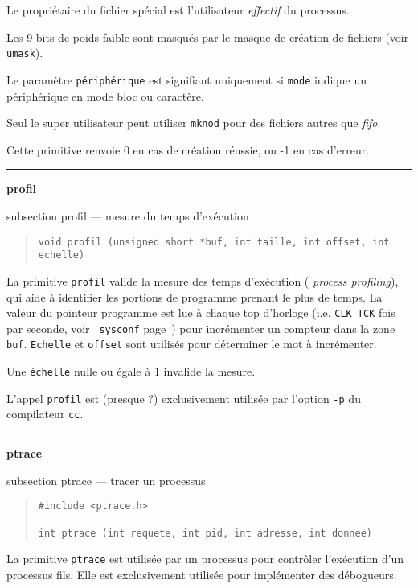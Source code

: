 \documentclass [twoside] {report}
\newcommand {\primitive} [1]
    {
	{\large \bf #1}
	\addcontentsline {toc} {subsection} {#1}
    }
\newcommand {\separation}
    {
	\vspace {7mm}
	\nopagebreak
	\hrule
    }
\begin{document}
Le propriétaire du fichier spécial est
l'utilisateur {\it effectif} du processus.

Les 9 bits de poids faible sont masqués par le
masque de création de fichiers (voir {\tt umask}).

Le paramètre {\tt périphérique} est signifiant
uniquement si {\tt mode} indique un périphérique en
mode bloc ou caractère.

Seul le super utilisateur peut utiliser {\tt mknod}
pour des fichiers autres que {\it fifo}.

Cette primitive renvoie 0 en cas de création
réussie, ou -1 en cas d'erreur.




\separation
\primitive {profil} --- mesure du temps d'exécution

\begin {quote}
\begin {verbatim}
void profil (unsigned short *buf, int taille, int offset, int echelle)
\end{verbatim}
\end {quote}

La primitive {\tt profil} valide la mesure des temps d'exécution ({\it
process profiling}), qui aide à identifier les portions de programme
prenant le plus de temps. La valeur du pointeur programme est lue à
chaque top d'horloge (i.e. {\tt CLK\_TCK} fois par seconde, voir {\tt
sysconf} page~\pageref {sysconf}) pour incrémenter un compteur dans
la zone {\tt buf}. {\tt Echelle} et {\tt offset} sont utilisés pour
déterminer le mot à incrémenter.

Une {\tt échelle} nulle ou égale à 1 invalide la
mesure.

L'appel {\tt profil} est (presque ?) exclusivement
utilisée par l'option {\tt -p} du compilateur {\tt cc}.




\separation
\primitive {ptrace} --- tracer un processus

\begin {quote}
\begin {verbatim}
#include <ptrace.h>

int ptrace (int requete, int pid, int adresse, int donnee)
\end{verbatim}
\end {quote}

La primitive {\tt ptrace} est utilisée par un
processus pour contrôler l'exécution d'un
processus fils. Elle est exclusivement utilisée
pour implémenter des débogueurs.
\end{document}
